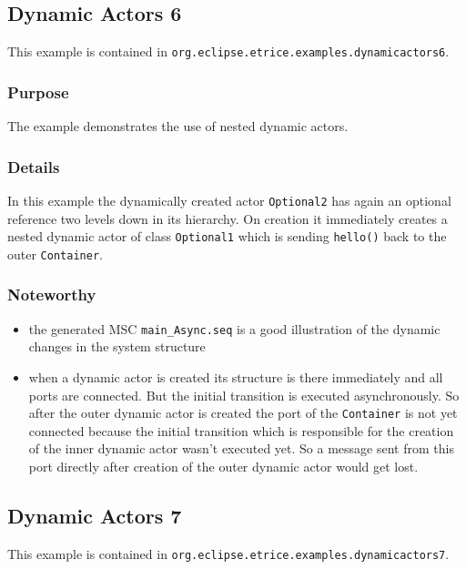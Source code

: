 \subsection{Dynamic Actors 6}

This example is contained in \texttt{org.eclipse.etrice.examples.dynamicactors6}.

\subsubsection{Purpose}

The example demonstrates the use of nested dynamic actors.

\subsubsection{Details}

In this example the dynamically created actor \texttt{Optional2} has again an optional reference two levels down in its hierarchy.
On creation it immediately creates a nested dynamic actor of class \texttt{Optional1} which is sending \texttt{hello()} back
to the outer \texttt{Container}.

\subsubsection{Noteworthy}

\begin{itemize}
\item the generated MSC \texttt{main\_Async.seq} is a good illustration of the dynamic changes in the system structure
\item when a dynamic actor is created its structure is there immediately and all ports are connected. But the initial transition
is executed asynchronously. So after the outer dynamic actor is created the port of the \texttt{Container} is not yet connected
because the initial transition which is responsible for the creation of the inner dynamic actor wasn't executed yet.
So a message sent from this port directly after creation of the outer dynamic actor would get lost.
\end{itemize}

\subsection{Dynamic Actors 7}

This example is contained in \texttt{org.eclipse.etrice.examples.dynamicactors7}.

